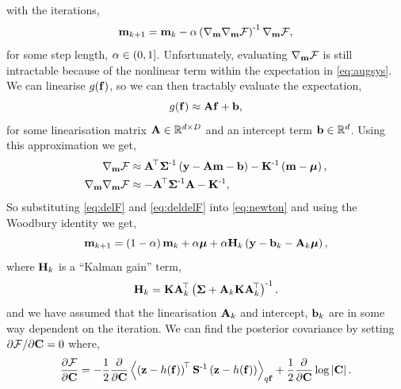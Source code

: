 \documentclass{article} %
\begin{document}
with the iterations,
\begin{equation}
    \pomean_{k+1} = \pomean_k -
    \step\brac{\nabla_\pomean\nabla_\pomean\Fengy}\inv \nabla_\pomean\Fengy,
    \label{eq:newton}
\end{equation}
for some step length, $\step \in (0, 1]$. Unfortunately, evaluating
$\nabla_\pomean\Fengy$ is still intractable because of the nonlinear term
within the expectation in \eqref{eq:augsys}. We can linearise
$\nonlin{\lstate}$, so we can then tractably evaluate the expectation,
\begin{equation}
    \nonlin{\lstate} \approx \Linmat\lstate + \intcpt,
    \label{eq:linearise}
\end{equation}
for some linearisation matrix $\Linmat \in \real{d \times D}$ and an intercept
term $\intcpt \in \real{d}$. Using this approximation we get,
\begin{align}
    \nabla_\pomean \Fengy
        &\approx \Linmat\transpose\lcov\inv\brac{\obs - \Linmat\pomean 
            - \intcpt} - \prcov\inv\brac{\pomean - \prmean}, 
        \label{eq:delF} \\
    \nabla_\pomean \nabla_\pomean \Fengy
        &\approx - \Linmat\transpose\lcov\inv\Linmat - \prcov\inv,
        \label{eq:deldelF}
\end{align}
So substituting \eqref{eq:delF} and \eqref{eq:deldelF} into \eqref{eq:newton}
and using the Woodbury identity we get,
\begin{equation}
    \pomean_{k+1} = \brac{1-\step}\pomean_k + \step\prmean 
        + \step\Kgain_k\brac{\obs - \intcpt_k - \Linmat_k\prmean},
    \label{eq:pomean}
\end{equation}
where $\Kgain_k$ is a ``Kalman gain'' term,
\begin{equation}
    \Kgain_k = \prcov\Linmat_k\transpose\brac{\lcov +
        \Linmat_k\prcov\Linmat_k\transpose}\inv.
    \label{eq:kgain}
\end{equation}
and we have assumed that the linearisation $\Linmat_k$ and intercept,
$\intcpt_k$ are in some way dependent on the iteration. We can find the 
posterior covariance by setting $\partial\Fengy/\partial\pocov = 0$ where,
\begin{equation}
    \frac{\partial\Fengy}{\partial\pocov} = -\frac{1}{2} 
        \frac{\partial}{\partial\pocov}
        \expec{q\lstate}{
            \brac{\augobs - \augnonlin{\lstate}}\transpose\augcov\inv
            \brac{\augobs - \augnonlin{\lstate}}
    } 
    + \frac{1}{2} \frac{\partial}{\partial\pocov} \log \deter{\pocov}.
\end{equation}
\end{document}
